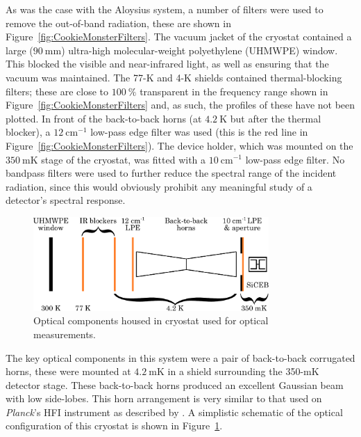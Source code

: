 As was the case with the Aloysius system, a number of filters were used to remove the out-of-band radiation, these are shown in Figure~\ref{fig:CookieMonsterFilters}. The vacuum jacket of the cryostat contained a large ($90~\mathrm{mm}$) ultra-high molecular-weight polyethylene (UHMWPE) window. This blocked the visible and near-infrared light, as well as ensuring that the vacuum was maintained. The 77-K and 4-K shields contained thermal-blocking filters; these are close to $100~\%$ transparent in the frequency range shown in Figure~\ref{fig:CookieMonsterFilters} and, as such, the profiles of these have not been plotted. In front of the back-to-back horns (at $4.2~\mathrm{K}$ but after the thermal blocker), a $12~\mathrm{cm}^{-1}$ low-pass edge filter was used (this is the red line in Figure~\ref{fig:CookieMonsterFilters}). The device holder, which was mounted on the $350~\mathrm{mK}$ stage of the cryostat, was fitted with a $10~\mathrm{cm}^{-1}$ low-pass edge filter. No bandpass filters were used to further reduce the spectral range of the incident radiation, since this would obviously prohibit any meaningful study of a detector's spectral response.
\begin{figure}[tb]
\begin{center}
\includegraphics[width = 0.8\textwidth]{figures/CookieMonsterOptics}
\caption[Optical components housed in cryostat used for optical measurements]{Optical components housed in cryostat used for optical measurements.}
\label{fig:CookieMonsterOptics}
\end{center}
\end{figure}
\par
The key optical components in this system were a pair of back-to-back corrugated horns, these were mounted at $4.2~\mathrm{mK}$ in a shield surrounding the 350-mK detector stage. These back-to-back horns produced an excellent Gaussian beam with low side-lobes. This horn arrangement is very similar to that used on \textit{Planck}'s HFI instrument as described by \textcite{Maffei2010}. A simplistic schematic of the optical configuration of this cryostat is shown in Figure~\ref{fig:CookieMonsterOptics}.  
